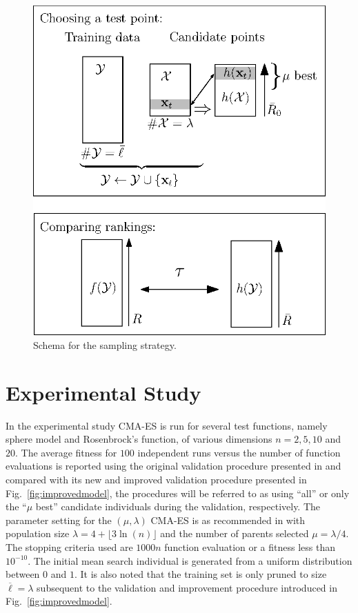 \documentclass[10pt, conference]{IEEEtran} %
\begin{document}
\begin{figure}[t!]
\centering \includegraphics[width=0.6\columnwidth]{schema}
\caption{Schema for the sampling strategy.}\label{fig:schema} 
\end{figure}

\section{Experimental Study}\label{sec:Experiment}
In the experimental study CMA-ES  is run for several test functions, namely sphere model and Rosenbrock's function, of various dimensions $n=2,5,10$ and $20$. The average fitness for $100$ independent runs versus the number of function evaluations is reported using the original validation procedure presented in \cite{Ru06:PPSN} and compared with its new and improved validation procedure presented in Fig.~\ref{fig:improvedmodel}, %
the procedures will be referred to as using ``all'' or only the ``$\mu$ best'' candidate individuals during the validation, respectively. %
The parameter setting for the $(\mu,\lambda)$ CMA-ES is as recommended in \cite{hansen:ostermeier:01} with population size $\lambda = 4+\lfloor 3\ln(n)\rfloor$ and the number of parents selected $\mu=\lambda/4$. The stopping criteria used are $1000n$ function evaluation or a fitness less than $10^{-10}$. The initial mean search individual is generated from a uniform distribution between $0$ and $1$. It is also noted that the training set is only pruned to size $\overline{\ell} = \lambda$ subsequent to the validation and improvement procedure introduced in Fig.~\ref{fig:improvedmodel}. 
\end{document}
